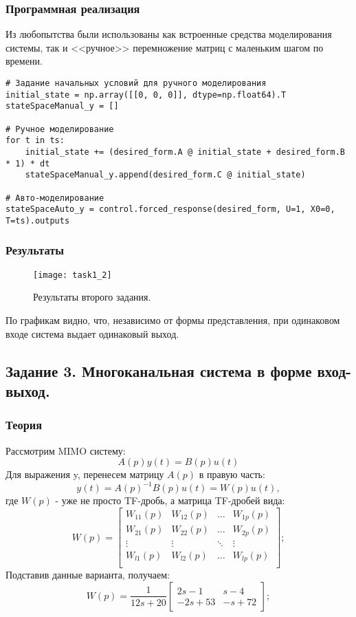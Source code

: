 \documentclass[16pt]{article}
\begin{document}
\subsubsection{Программная реализация}
Из любопытства были использованы как встроенные средства моделирования системы, так и <<ручное>> перемножение матриц с маленьким шагом по времени.
\begin{verbatim}
# Задание начальных условий для ручного моделирования
initial_state = np.array([[0, 0, 0]], dtype=np.float64).T
stateSpaceManual_y = []

# Ручное моделирование
for t in ts:
    initial_state += (desired_form.A @ initial_state + desired_form.B * 1) * dt
    stateSpaceManual_y.append(desired_form.C @ initial_state)

# Авто-моделирование
stateSpaceAuto_y = control.forced_response(desired_form, U=1, X0=0, T=ts).outputs
\end{verbatim}

\subsubsection{Результаты}
\begin{figure}[H]
	\centering
	\texttt{[image: task1\_2]}
	\caption{Результаты второго задания.}
	\label{fig:fig2}
\end{figure}
По графикам видно, что, независимо от формы представления, при одинаковом входе система выдает одинаковый выход.

\newpage
\subsection{Задание 3. Многоканальная система в форме вход-выход.}
\subsubsection{Теория}
Рассмотрим MIMO систему:
\[ 
    A(p)y(t) = B(p)u(t)
\]
Для выражения y, перенесем матрицу \(A(p)\) в правую часть:
\[
    y(t) = A(p)^{-1}B(p)u(t) = W(p)u(t),
\]
где \(W(p)\) - уже не просто TF-дробь, а матрица TF-дробей вида:
\[
    W(p) = \begin{bmatrix}
        W_{11}(p) & W_{12}(p) & \hdots & W_{1p}(p)\\
        W_{21}(p) & W_{22}(p) & \hdots & W_{2p}(p)\\
        \vdots & \vdots & \ddots & \vdots \\
        W_{l1}(p) & W_{l2}(p) & \hdots & W_{lp}(p)\\
        \end{bmatrix};
\]
Подставив данные варианта, получаем:
\[
    W(p) = \frac{1}{12s+20}\begin{bmatrix}
        2s - 1 & s - 4 \\
        -2s + 53 & -s + 72
        \end{bmatrix};
\]
\end{document}

